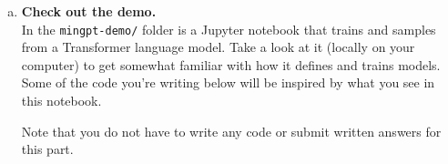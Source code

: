 \begin{enumerate}[(a)]
\item {} \textbf{Check out the demo.}\\
In  the \texttt{mingpt-demo/} folder is a Jupyter notebook that trains and samples from a Transformer language model.
Take a look at it (locally on your computer) to get somewhat familiar with how it defines and trains models.
Some of the code you're writing below will be inspired by what you see in this notebook.

Note that you do not have to write any code or submit written answers for this part.




\end{enumerate}
